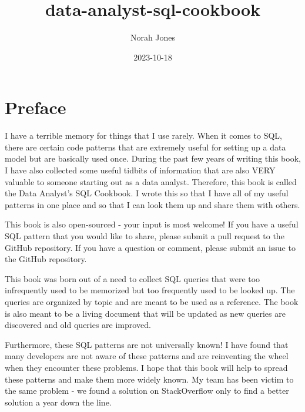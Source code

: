 \documentclass[
  letterpaper,
  DIV=11,
  numbers=noendperiod]{scrreprt}
\title{data-analyst-sql-cookbook}
\author{Norah Jones}
\date{2023-10-18}
\renewcommand*\contentsname{Table of contents}
\newcommand\contentsname{Table of contents}
\begin{document}
\maketitle
\ifdefined\Shaded\renewenvironment{Shaded}{\begin{tcolorbox}[interior hidden, sharp corners, boxrule=0pt, borderline west={3pt}{0pt}{shadecolor}, enhanced, breakable, frame hidden]}{\end{tcolorbox}}\fi

\renewcommand*\contentsname{Table of contents}
{
\hypersetup{linkcolor=}
\setcounter{tocdepth}{2}
\tableofcontents
}

\hypertarget{preface}{%
\chapter*{Preface}\label{preface}}


I have a terrible memory for things that I use rarely. When it comes to
SQL, there are certain code patterns that are extremely useful for
setting up a data model but are basically used once. During the past few
years of writing this book, I have also collected some useful tidbits of
information that are also VERY valuable to someone starting out as a
data analyst. Therefore, this book is called the Data Analyst's SQL
Cookbook. I wrote this so that I have all of my useful patterns in one
place and so that I can look them up and share them with others.

This book is also open-sourced - your input is most welcome! If you have
a useful SQL pattern that you would like to share, please submit a pull
request to the GitHub repository. If you have a question or comment,
please submit an issue to the GitHub repository.

This book was born out of a need to collect SQL queries that were too
infrequently used to be memorized but too frequently used to be looked
up. The queries are organized by topic and are meant to be used as a
reference. The book is also meant to be a living document that will be
updated as new queries are discovered and old queries are improved.

Furthermore, these SQL patterns are not universally known! I have found
that many developers are not aware of these patterns and are reinventing
the wheel when they encounter these problems. I hope that this book will
help to spread these patterns and make them more widely known. My team
has been victim to the same problem - we found a solution on
StackOverflow only to find a better solution a year down the line.
\end{document}
